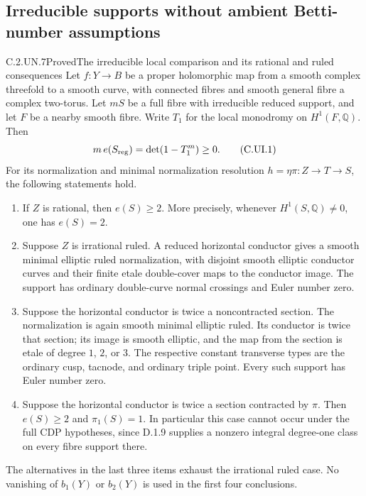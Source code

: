 \subsection{Irreducible supports without ambient Betti-number assumptions}

\begin{statement}{C.2.UN.7}{Proved}{The irreducible local comparison and its rational and ruled consequences}
Let $f:Y\to B$ be a proper holomorphic map from a smooth
complex threefold to a smooth curve, with connected fibres
and smooth general fibre a complex two-torus. Let $mS$ be a full
fibre with irreducible reduced support, and let $F$ be a nearby
smooth fibre. Write $T_1$ for the local monodromy on
$H^1(F,\mathbb Q)$. Then
\[
 m\,e(S_{\rm reg})=\det(1-T_1^m)\ge0.
 \tag{C.UI.1}
\]
For its normalization and minimal normalization resolution
$h=\eta\pi:Z\to T\to S$, the following statements hold.

\begin{enumerate}
\item If $Z$ is rational, then $e(S)\ge2$. More precisely,
      whenever $H^1(S,\mathbb Q)\ne0$, one has $e(S)=2$.
\item Suppose $Z$ is irrational ruled. A reduced horizontal
      conductor gives a smooth minimal elliptic ruled
      normalization, with disjoint smooth elliptic conductor
      curves and their finite etale double-cover maps to the
      conductor image. The support has ordinary double-curve
      normal crossings and Euler number zero.
\item Suppose the horizontal conductor is twice a noncontracted
      section. The normalization is again smooth minimal
      elliptic ruled. Its conductor is twice that section;
      its image is smooth elliptic, and the map from the
      section is etale of degree $1$, $2$, or $3$.
      The respective constant transverse types are the
      ordinary cusp, tacnode, and ordinary triple point.
      Every such support has Euler number zero.
\item Suppose the horizontal conductor is twice a section
      contracted by $\pi$. Then $e(S)\ge2$ and
      $\pi_1(S)=1$. In particular this case cannot occur
      under the full CDP hypotheses, since D.1.9 supplies
      a nonzero integral degree-one class on every fibre
      support there.
\end{enumerate}
The alternatives in the last three items exhaust the
irrational ruled case. No vanishing of $b_1(Y)$ or $b_2(Y)$
is used in the first four conclusions.
\end{statement}
